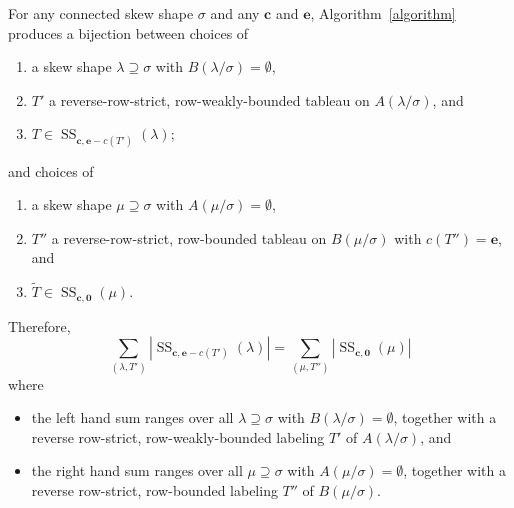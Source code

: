 \documentclass[ALCO,ThmDefs,Unicode,epreuves]{cedram}
\DeclareMathOperator{\Semi}{SS}
\newcommand{\bfc}{\mathbf{c}}
\newcommand{\bfe}{\mathbf{e}}
\newcommand{\bfzr}{\mathbf{0}}
\newcommand{\wt}{\widetilde}
\begin{document}
\begin{prop} \label{p:main}
For any connected skew shape $\sigma$ and any $\bfc$ and $\bfe$, Algorithm~\ref{algorithm} produces a bijection between choices of 
\begin{enumerate}
\item a skew shape $\lambda \supseteq \sigma$ with $B(\lambda/\sigma)=\emptyset$,
\item $T'$ a reverse-row-strict, row-weakly-bounded tableau on $A(\lambda/\sigma)$, and
\item $T\in \Semi_{\bfc,\bfe-c(T')}(\lambda)$;
\end{enumerate}

\noindent
and choices of
\begin{enumerate}
\item a skew shape $\mu\supseteq \sigma$ with $A(\mu/\sigma)=\emptyset$,
\item $T''$ a reverse-row-strict, row-bounded tableau on $B(\mu/\sigma)$ with $c(T'')=\bfe$, and
\item $\wt{T} \in \Semi_{\bfc,\bfzr}(\mu)$.
\end{enumerate}
Therefore, 
\begin{equation}\label{eq:ss}
\sum_{(\lambda, T')} |\Semi_{\bfc, \bfe-c(T')}(\lambda)| = \sum_{(\mu,T'')} |\Semi_{\bfc, \mathbf{0}}(\mu)|
\end{equation}
where
\begin{itemize}
\item the left hand sum ranges over all $\lambda\supseteq \sigma$ with $B(\lambda/\sigma)=\emptyset$, together with a reverse row-strict, row-weakly-bounded labeling $T'$ of $A(\lambda/\sigma)$, and
\item the right hand sum ranges over all $\mu\supseteq \sigma$ with $A(\mu/\sigma) = \emptyset$, together with a reverse row-strict, row-bounded labeling $T''$ of $B(\mu/\sigma)$.
\end{itemize}
\end{prop}
\end{document}
